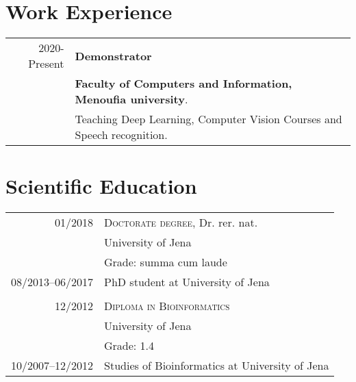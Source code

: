 \documentclass[a4paper,10pt]{article} %
\begin{document}
\section{\textbf{Work Experience}}

\begin{tabular}{r|l}
2020-Present  & \textbf{Demonstrator} \\&\textbf{Faculty of Computers and Information, Menoufia university}.\\& Teaching Deep Learning, Computer Vision Courses and Speech recognition.
\\
\end{tabular}

\section{\textbf{Scientific Education}}

\begin{tabular}{r|l}	
01/2018 							& \textsc{Doctorate degree}, Dr. rer. nat. \\
									& University of Jena \\
									& Grade: summa cum laude \\ 
\footnotesize{08/2013--06/2017} 	& \footnotesize{PhD student at University of Jena}\\

\multicolumn{2}{c}{} \\	%

12/2012 							& \textsc{Diploma in Bioinformatics}\\
          							& University of Jena  \\
          							& Grade: 1.4 \\
\footnotesize{10/2007--12/2012} 	& \footnotesize{Studies of Bioinformatics at University of Jena}\\
\end{tabular}

%	
%
\end{document}
